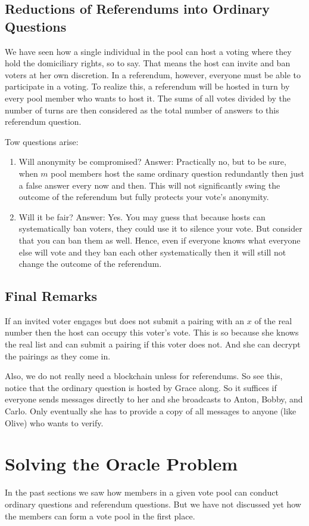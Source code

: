 \documentclass{article}
\theoremstyle{definition}
\begin{document}
	\subsection{Reductions of Referendums into Ordinary Questions}
	We have seen how a single individual in the pool can host a voting where they hold the domiciliary rights, so to say. That means the host can invite and ban voters at her own discretion. In a referendum, however, everyone must be able to participate in a voting. To realize this, a referendum will be hosted in turn by every pool member who wants to host it. The sums of all votes divided by the number of turns are then considered as the total number of answers to this referendum question.
	
	Tow questions arise:
	\begin{enumerate}
		\item Will anonymity be compromised? Answer: Practically no, but to be sure, when $m$ pool members host the same ordinary question redundantly then just a false answer every now and then. This will not significantly swing the outcome of the referendum but fully protects your vote's anonymity.
		\item Will it be fair? Answer: Yes. You may guess that because hosts can systematically ban voters, they could use it to silence your vote. But consider that you can ban them as well. Hence, even if everyone knows what everyone else will vote and they ban each other systematically then it will still not change the outcome of the referendum.
	\end{enumerate}

	\subsection{Final Remarks}
	If an invited voter engages but does not submit a pairing with an $x$ of the real number then the host can occupy this voter's vote. This is so because she knows the real list and can submit a pairing if this voter does not. And she can decrypt the pairings as they come in.
	
	Also, we do not really need a blockchain unless for referendums. So see this, notice that the ordinary question is hosted by Grace along. So it suffices if everyone sends messages directly to her and she broadcasts to Anton, Bobby, and Carlo. Only eventually she has to provide a copy of all messages to anyone (like Olive) who wants to verify.
	
	\section{Solving the Oracle Problem}
	In the past sections we saw how members in a given vote pool can conduct ordinary questions and referendum questions. But we have not discussed yet how the members can form a vote pool in the first place.
	
\end{document}
